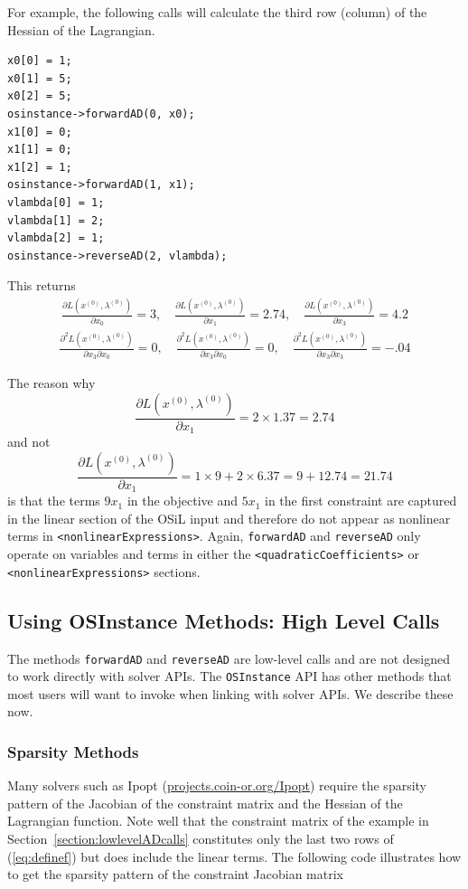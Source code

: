 \documentclass[11pt]{article}
\newcommand{\D}[2]{ \frac{\partial #1}{\partial #2} }
\newcommand{\DD}[3]{ \frac{\partial^2 #1}{\partial #2 \partial #3} }
\renewcommand{\_}{{\char"5F}}
\renewcommand{\{}{{\char"7B}}
\renewcommand{\}}{{\char"7D}}
\renewcommand{\^}{{\char"0D}}
\renewcommand{\'}{{\char"0D}}
\newif\ifknitro \knitrofalse    %
\begin{document}
\begin{enumerate}[Step 1:]
For example, the  following calls will calculate the third row (column) of the Hessian of the Lagrangian.
\begin{verbatim}
x0[0] = 1;
x0[1] = 5;
x0[2] = 5;
osinstance->forwardAD(0, x0);
x1[0] = 0;
x1[1] = 0;
x1[2] = 1;
osinstance->forwardAD(1, x1);
vlambda[0] = 1;
vlambda[1] = 2;
vlambda[2] = 1;
osinstance->reverseAD(2, vlambda);
\end{verbatim}
This returns
\begin{eqnarray*}
\D{L (x^{(0)}, \lambda^{(0)})}{x_{0}} = 3, \quad  \D{L (x^{(0)}, \lambda^{(0)})}{x_{1}} = 2.74, \quad  \D{L (x^{(0)}, \lambda^{(0)})}{x_{3}} = 4.2
\end{eqnarray*}
\begin{eqnarray*}
\DD{L(x^{(0)}, \lambda^{(0)})}{x_{3}}{x_{0}} =0, \quad  \DD{L(x^{(0)}, \lambda^{(0)})}{x_{3}}{x_{0}} = 0, \quad   \DD{L(x^{(0)}, \lambda^{(0)})}{x_{3}}{x_{3}} =  -.04
\end{eqnarray*}

The reason why
$$
\D{L (x^{(0)}, \lambda^{(0)})}{x_{1}} = 2 \times 1.37 = 2.74
$$
and not
$$
\D{L (x^{(0)}, \lambda^{(0)})}{x_{1}} = 1 \times  9 + 2 \times 6.37 = 9 + 12.74 = 21.74
$$
is that the terms $9x_1$ in the objective and $5x_1$ in the first constraint
are captured in the linear section of the OSiL input and therefore do not appear as nonlinear terms 
in {\tt  <nonlinearExpressions>}. Again, {\tt forwardAD} and {\tt reverseAD} only operate on variables and terms 
in either the {\tt <quadraticCoefficients>} or {\tt <nonlinearExpressions>} sections.

\subsection{Using OSInstance Methods: High Level Calls}

The methods {\tt forwardAD} and {\tt reverseAD} are low-level calls and are not designed to work directly with solver APIs. The {\tt OSInstance} API has other methods that most users will want to invoke when linking with solver APIs.  We describe these now.


\subsubsection{Sparsity Methods}

Many solvers such as Ipopt (\url{projects.coin-or.org/Ipopt}) \ifknitro or Knitro (\url{www.ziena.com}) \fi
require the sparsity pattern of the Jacobian of the constraint matrix and the Hessian of the Lagrangian function.  
Note well that the constraint matrix of the example in Section~\ref{section:lowlevelADcalls}
constitutes only the last two rows of (\ref{eq:definef}) but does include the linear terms.  
The following code illustrates how to get the sparsity pattern of the constraint Jacobian matrix


\end{enumerate}
\end{document}
